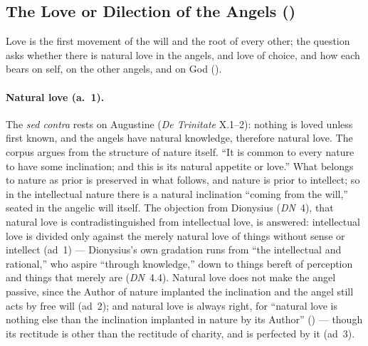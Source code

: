 \subsection{The Love or Dilection of the Angels ()}\label{sec:q60}

Love is the first movement of the will and the root of every other; the
question asks whether there is natural love in the angels, and love of
choice, and how each bears on self, on the other angels, and on God
().

\paragraph{Natural love (a.~1).} The \emph{sed contra} rests on
Augustine (\emph{De Trinitate} X.1--2): nothing is
loved unless first known, and the angels have natural knowledge,
therefore natural love. The corpus argues from the structure of nature
itself. ``It is common to every nature to have some inclination; and
this is its natural appetite or love.'' What belongs to nature as prior
is preserved in what follows, and nature is prior to intellect; so in
the intellectual nature there is a natural inclination ``coming from the
will,''  seated in the angelic will itself.
The objection from Dionysius (\emph{DN}~4), that natural love is
contradistinguished from intellectual love, is answered: intellectual
love is divided only against the merely natural love of things without
sense or intellect (ad~1) --- Dionysius's own gradation runs from ``the
intellectual and rational,'' who aspire ``through knowledge,'' down to
things bereft of perception and things that merely are (\emph{DN}~4.4).
Natural love does not make the angel passive, since the Author of nature
implanted the inclination and the angel still acts by free will (ad~2);
and natural love is always right, for ``natural love is nothing else
than the inclination implanted in nature by its Author'' () --- though its rectitude is other than the rectitude of
charity, and is perfected by it (ad~3).

